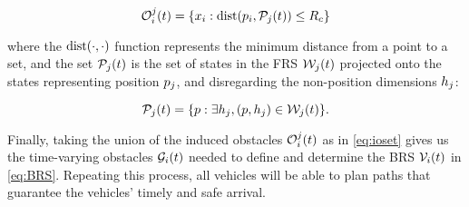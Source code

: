 \begin{equation}
\mathcal{O}_i^j(t) = \{x_i: \text{dist}(p_i, \mathcal{P}_j(t)) \le R_c \}
\end{equation}

\noindent where the $\text{dist}(\cdot, \cdot)$ function represents the minimum distance from a point to a set, and the set $\mathcal{P}_j(t)$ is the set of states in the FRS $\mathcal{W}_j(t)$ projected onto the states representing position $p_j$, and disregarding the non-position dimensions $h_j$:

\begin{equation}
\mathcal{P}_j(t) = \{p: \exists h_j, (p, h_j) \in \mathcal{W}_j(t)\}.
\end{equation}

Finally, taking the union of the induced obstacles $\mathcal{O}_i^j(t)$ as in \eqref{eq:ioset} gives us the time-varying obstacles $\mathcal{G}_i(t)$ needed to define and determine the BRS $\mathcal{V}_i(t)$ in \eqref{eq:BRS}. Repeating this process, all vehicles will be able to plan paths that guarantee the vehicles' timely and safe arrival.
